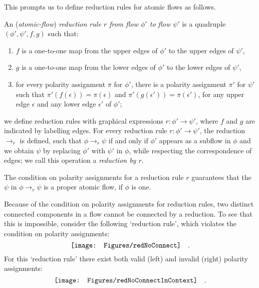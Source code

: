 This prompts us to define reduction rules for atomic flows as follows.

\begin{definition}\label{definition:FlowReductionRule}
An (\emph{atomic-flow}) \emph{reduction rule $r$ from flow $\phi'$ to flow $\psi'$} is a quadruple $(\phi',\psi',f,g)$ such that:
\begin{enumerate}
\item $f$ is a one-to-one map from the upper edges of $\phi'$ to the upper edges of $\psi'$,
\item $g$ is a one-to-one map from the lower edges of $\phi'$ to the lower edges of $\psi'$,
\item for every polarity assignment $\pi$ for $\phi'$, there is a polarity assignment $\pi'$ for $\psi'$ such that $\pi'(f(\epsilon))=\pi(\epsilon)$ and $\pi'(g(\epsilon'))=\pi(\epsilon')$, for any upper edge $\epsilon$ and any lower edge $\epsilon'$ of $\phi'$;
\end{enumerate}
we define reduction rules with graphical expressions $r\colon\phi'\to\psi'$, where $f$ and $g$ are indicated by labelling edges. For every reduction rule $r\colon\phi'\to\psi'$, the reduction ${\to_r}$ is defined, such that $\phi\to_r\psi$ if and only if $\phi'$ appears as a subflow in $\phi$ and we obtain $\psi$ by replacing $\phi'$ with $\psi'$ in $\phi$, while respecting the correspondence of edges; we call this operation a \emph{reduction by $r$}.
\end{definition}

\begin{remark}\label{remark:FlowReductionRuleProperFlow}
The condition on polarity assignments for a reduction rule $r$ guarantees that the $\psi$ in $\phi\to_r\psi$ is a proper atomic flow, if $\phi$ is one.
\end{remark}

\begin{remark}\label{remark:FlowReductionRuleNoConnect}
Because of the condition on polarity assignments for reduction rules, two distinct connected components in a flow cannot be connected by a reduction. To see that this is impossible, consider the following `reduction rule', which violates the condition on polarity assignments:
\[
\vcenter{\hbox{\texttt{[image: Figures/redNoConnect]}}}
\quad.
\]
\afnegspace
For this `reduction rule' there exist both valid (left) and invalid (right) polarity assignments:
\[
\vcenter{\hbox{\texttt{[image: Figures/redNoConnectInContext]}}}
\quad.
\]
\afnegspace
\end{remark}

